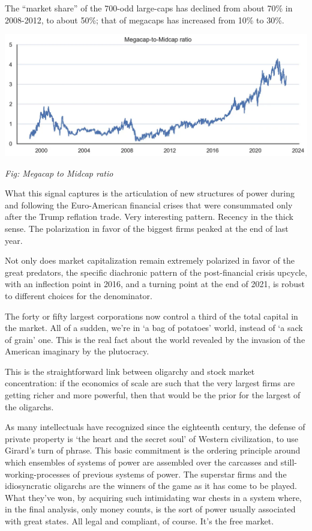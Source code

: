 \documentclass[
]{book}
\begin{document}
The ``market share'' of the 700-odd large-caps has declined from about 70\% in 2008-2012, to about 50\%; that of megacaps has increased from 10\% to 30\%.

\includegraphics{fig/megacap_to_midcap.png}

\emph{Fig: Megacap to Midcap ratio}

What this signal captures is the articulation of new structures of power during and following the Euro-American financial crises that were consummated only after the Trump reflation trade. Very interesting pattern. Recency in the thick sense.
The polarization in favor of the biggest firms peaked at the end of last year.

Not only does market capitalization remain extremely polarized in favor of the great predators, the specific diachronic pattern of the post-financial crisis upcycle, with an inflection point in 2016, and a turning point at the end of 2021, is robust to different choices for the denominator.

The forty or fifty largest corporations now control a third of the total capital in the market.
All of a sudden, we're in `a bag of potatoes' world, instead of `a sack of grain' one.
This is the real fact about the world revealed by the invasion of the American imaginary by the plutocracy.

This is the straightforward link between oligarchy and stock market concentration: if the economics of scale are such that the very largest firms are getting richer and more powerful, then that would be the prior for the largest of the oligarchs.

As many intellectuals have recognized since the eighteenth century, the defense of private property is `the heart and the secret soul' of Western civilization, to use Girard's turn of phrase. This basic commitment is the ordering principle around which ensembles of systems of power are assembled over the carcasses and still-working-processes of previous systems of power. The superstar firms and the idiosyncratic oligarchs are the winners of the game as it has come to be played. What they've won, by acquiring such intimidating war chests in a system where, in the final analysis, only money counts, is the sort of power usually associated with great states. All legal and compliant, of course. It's the free market.
\end{document}
